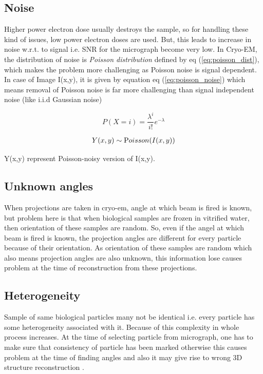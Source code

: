 \documentclass{report}
\begin{document}
\subsection{Noise}
Higher power electron dose usually destroys the sample, so for handling these kind of issues, low power electron doses are used. But, this leads to increase in noise w.r.t. to signal i.e. SNR for the micrograph become very low. In Cryo-EM, the distribution of noise is \textit{Poisson distribution} defined by eq (\ref{eq:poisson_dist}), which makes the problem more challenging as Poisson noise is signal dependent. In case of Image I(x,y), it is given by equation eq (\ref{eq:poisson_noise}) which means removal of Poisson noise is far more challenging than signal independent noise (like i.i.d Gaussian noise)  

\begin{equation}\label{eq:poisson_dist}
    P(X=i) = \frac{\lambda^i}{i!} e^{-\lambda}
\end{equation}

\begin{equation}\label{eq:poisson_noise}
    \begin{aligned}
        Y(x,y) &  \sim \textrm Poisson(I(x,y))\\
    \end{aligned}
\end{equation}

Y(x,y) represent Poisson-noisy version of I(x,y).\\

\subsection{Unknown angles}
When projections are taken in cryo-em, angle at which beam is fired is known, but problem here is that when biological samples are frozen in vitrified water, then orientation of these samples are random. So, even if the angel at which beam is fired is known, the projection angles are different for every particle because of their orientation. As orientation of these samples are random which also means projection angles are also unknown, this information lose causes problem at the time of reconstruction from these projections.

\subsection{Heterogeneity}
Sample of same biological particles many not be identical i.e. every particle has some heterogeneity associated with it. Because of this complexity in whole process increases. At the time of selecting particle from micrograph, one has to make sure that consistency of particle has been marked otherwise this causes problem at the time of finding angles and also it may give rise to wrong 3D structure reconstruction \cite{sigworth2016principles}.
\end{document}
